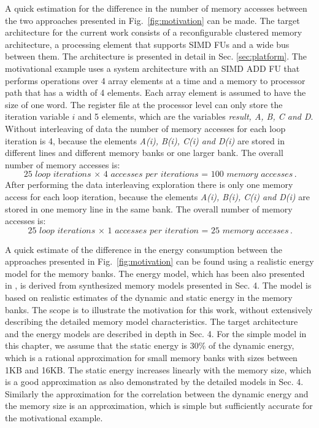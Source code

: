 \documentclass[prodmode,acmtecs]{acmsmall}
\begin{document}
A quick estimation for the difference in the number of memory accesses between the two approaches presented in Fig.~\ref{fig:motivation} can be made.
The target architecture for the current work consists of a reconfigurable clustered memory architecture, a processing element that supports SIMD FUs and a wide bus between them.
The architecture is presented in detail in Sec. \ref{sec:platform}.
The motivational example uses a system architecture with an SIMD ADD FU that performs operations over 4 array elements at a time and a memory to processor path that has a width of 4 elements. 
Each array element is assumed to have the size of one word.
The register file at the processor level can only store the iteration variable $i$ and 5 elements, which are the variables \textit{result, A, B, C and D}.
Without interleaving of data the number of memory accesses for each loop iteration is 4, because the elements \textit{A(i), B(i), C(i) and D(i)} are stored in different lines and different memory banks or one larger bank.
The overall number of memory accesses is:
	\begin{equation}
		\textit{25 loop iterations $\times$ 4 accesses per iterations = 100 memory accesses}.
	\end{equation}	 
After performing the data interleaving exploration there is only one memory access for each loop iteration, because the elements \textit{A(i), B(i), C(i) and D(i)} are stored in one memory line in the same bank.
The overall number of memory accesses is:
	\begin{equation}
		\textit{25 loop iterations $\times$ 1 accesses per iteration = 25 memory accesses}.
	\end{equation}	 	

A quick estimate of the difference in the energy consumption between the approaches presented in Fig.~\ref{fig:motivation} can be found using a realistic energy model for the memory banks.
The energy model, which has been also presented in \cite{sharma2015array}, is derived from synthesized memory models presented in Sec. 4.
The model is based on realistic estimates of the dynamic and static energy in the memory banks.
The scope is to illustrate the motivation for this work, without extensively describing the detailed memory model characteristics. 
The target architecture and the energy models are described in depth in Sec. 4. 
For the simple model in this chapter, we assume that the static energy is 30\% of the dynamic energy, which is a rational approximation for small memory banks with sizes between 1KB and 16KB.
The static energy increases linearly with the memory size, which is a good approximation as also demonstrated by the detailed models in Sec. 4.
Similarly the approximation for the correlation between the dynamic energy and the memory size is an approximation, which is simple but sufficiently accurate for the motivational example.
\end{document}
